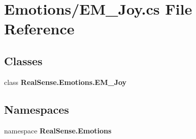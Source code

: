 \section{Emotions/\+E\+M\+\_\+\+Joy.cs File Reference}
\label{_e_m___joy_8cs}
\subsection*{Classes}
\begin{DoxyCompactItemize}
\item 
class \textbf{ Real\+Sense.\+Emotions.\+E\+M\+\_\+\+Joy}
\end{DoxyCompactItemize}
\subsection*{Namespaces}
\begin{DoxyCompactItemize}
\item 
namespace \textbf{ Real\+Sense.\+Emotions}
\end{DoxyCompactItemize}
